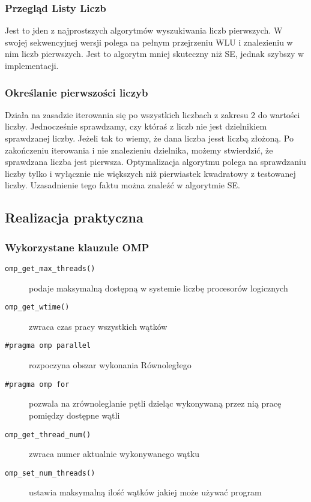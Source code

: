 \documentclass{article}
\begin{document}
            \subsubsection{Przegląd Listy Liczb}
                Jest to jden z najprostszych algorytmów wyszukiwania liczb pierwszych. W swojej sekwencyjnej wersji polega na pełnym przejrzeniu \gls{WLU} i znalezieniu w nim liczb pierwszych. Jest to algorytm mniej skuteczny niż \gls{SE}, jednak szybszy w implementacji.
                
            \subsubsection{Określanie pierwszości liczyb}
                Działa na zasadzie iterowania się po wszystkich liczbach z zakresu 2 do wartości liczby. Jednocześnie sprawdzamy, czy któraś z liczb nie jest dzielnikiem sprawdzanej liczby. Jeżeli tak to wiemy, że dana liczba jesst liczbą złożoną. Po zakończeniu iterowania i nie znalezieniu dzielnika, możemy stwierdzić, że sprawdzana liczba jest pierwsza. Optymalizacja algorytmu polega na sprawdzaniu liczby tylko i wyłącznie nie większych niż pierwiastek kwadratowy z testowanej liczby. Uzasadnienie tego faktu można znaleźć w algorytmie \gls{SE}.
        \subsection{Realizacja praktyczna}
            \subsubsection{Wykorzystane klauzule OMP}
                \begin{description}
                    \item[\texttt{omp\_get\_max\_threads()}] podaje maksymalną dostępną w systemie liczbę procesorów logicznych
                    \item[\texttt{omp\_get\_wtime()}] zwraca czas pracy wszystkich wątków
                    \item[\texttt{\#pragma\ omp\ parallel}] rozpoczyna obszar wykonania Równoległego
                    \item[\texttt{\#pragma\ omp\ for}] pozwala na zrównoleglanie pętli dzieląc wykonywaną przez nią pracę pomiędzy dostępne wątli 
                    \item[\texttt{omp\_get\_thread\_num()}] zwraca numer aktualnie wykonywanego wątku
                    \item[\texttt{omp\_set\_num\_threads()}] ustawia maksymalną ilość wątków jakiej może używać program
                    \item[]   
                \end{description}
            
\end{document}
